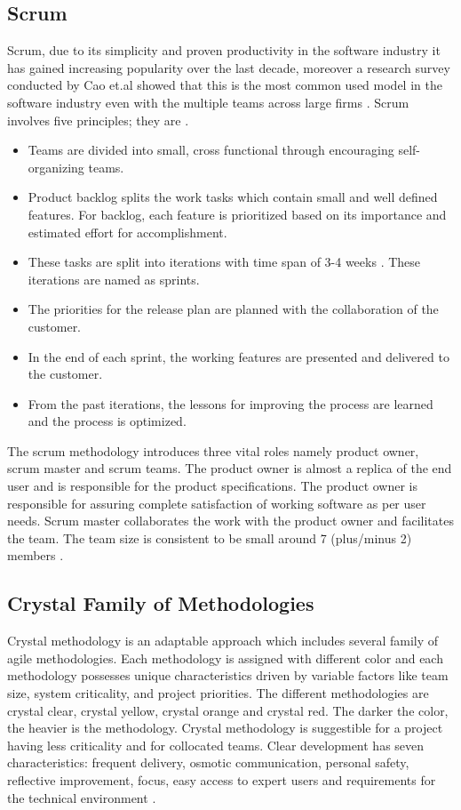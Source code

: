 \documentclass[a4paper,oneside]{bth}
\begin{document}
\subsection{Scrum}
Scrum, due to its simplicity and proven productivity in the software industry it has gained increasing popularity over the last decade, moreover a research survey conducted by Cao et.al showed that this is the most common used model in the software industry even with the multiple teams across large firms \cite{al_tamimi_empirical_2014}. Scrum involves five principles; they are \cite{al_tamimi_empirical_2014}.
\begin{itemize}
\item Teams are divided into small, cross functional through encouraging self-organizing teams.
\item Product backlog splits the work tasks which contain small and well defined features. For backlog, each feature is prioritized based on its importance and estimated effort for accomplishment.
\item These tasks are split into iterations with time span of 3-4 weeks \cite{al_tamimi_empirical_2014} \cite{abbas_using_2010}. These iterations are named as sprints. 
\item	The priorities for the release plan are planned with the collaboration of the customer.
\item	In the end of each sprint, the working features are presented and delivered to the customer.
\item From the past iterations, the lessons for improving the process are learned and the process is optimized.
\end{itemize}

The scrum methodology introduces three vital roles namely product owner, scrum master and scrum teams. The product owner is almost a replica of the end user and is responsible for the product specifications. The product owner is responsible for assuring complete satisfaction of working software as per user needs. Scrum master collaborates the work with the product owner and facilitates the team. The team size is consistent to be small around 7 (plus/minus 2) members \cite{al_tamimi_empirical_2014}.
\subsection{Crystal Family of Methodologies}
Crystal methodology is an adaptable approach which includes several family of agile methodologies. Each methodology is assigned with different color and each methodology possesses unique characteristics driven by variable factors like team size, system criticality, and project priorities. The different methodologies are crystal clear, crystal yellow, crystal orange and crystal red. The darker the color, the heavier is the methodology. Crystal methodology is suggestible for a project having less criticality and for collocated teams. Clear development has seven characteristics: frequent delivery, osmotic communication, personal safety, reflective improvement, focus, easy access to expert users and requirements for the technical environment \cite{dyba_a_empirical_2008}.
\end{document}
